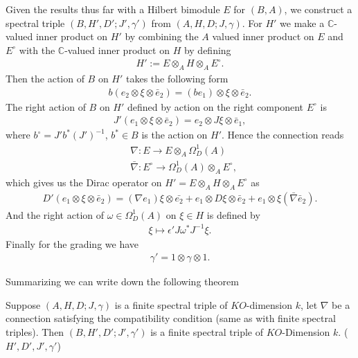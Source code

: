 Given the results thus far with a Hilbert bimodule $E$ for $(B, A)$, we
construct a spectral triple $(B, H', D'; J', \gamma ')$ from $(A, H, D; J,
\gamma)$. For $H'$ we make a $\mathbb{C}$-valued inner product on $H'$ by combining
the $A$ valued inner product on $E$ and $E^\circ$ with the
$\mathbb{C}$-valued inner product on $H$ by defining
\begin{align}
    H' := E\otimes _A H \otimes _A E^\circ.
\end{align}
Then the action of $B$ on $H'$ takes the following form
\begin{align}
    b(e_2 \otimes \xi \otimes \bar{e}_2 ) = (be_1) \otimes \xi \otimes
    \bar{e}_2.
\end{align}
The right action of $B$ on $H'$ defined by action on the right component
$E^\circ$ is
\begin{align}
    J'(e_1 \otimes \xi \otimes \bar{e}_2) = e_2 \otimes J \xi \otimes
    \bar{e}_1,
\end{align}
where $b^\circ = J' b^* (J')^{-1}$, $b^* \in B$ is the action on $H'$.
Hence the connection reads
\begin{align}
    &\nabla: E \rightarrow E\otimes _A \Omega _D ^1(A) \\
    &\bar{\nabla}:E^\circ \rightarrow \Omega _D^1(A) \otimes _A E^\circ,
\end{align}
which gives us the Dirac operator on $H' = E \otimes _A H \otimes _A
E^\circ$ as
\begin{align}
    D'(e_1 \otimes \xi \otimes \bar{e}_2) = (\nabla e_1) \xi \otimes
    \bar{e_2}+ e_1 \otimes D\xi \otimes \bar{e}_2 + e_1 \otimes
    \xi(\bar{\nabla}\bar{e}_2).
\end{align}
And the right action of $\omega \in \Omega _D ^1(A)$ on $\xi \in H$ is
defined by
\begin{align}
    \xi \mapsto \epsilon' J \omega ^* J^{-1}\xi.
\end{align}
Finally for the grading we have
\begin{align}
    \gamma ' = 1 \otimes \gamma \otimes 1.
\end{align}

Summarizing we can write down the following theorem
\begin{theorem}
    Suppose $(A, H, D; J, \gamma)$ is a finite spectral triple of
    $KO$-dimension $k$, let $\nabla$ be a connection satisfying the
    compatibility condition (same as with finite spectral triples).
    Then $(B, H',D'; J', \gamma')$ is a finite spectral triple of
    $KO$-Dimension $k$. ($H', D', J', \gamma'$)
\end{theorem}

